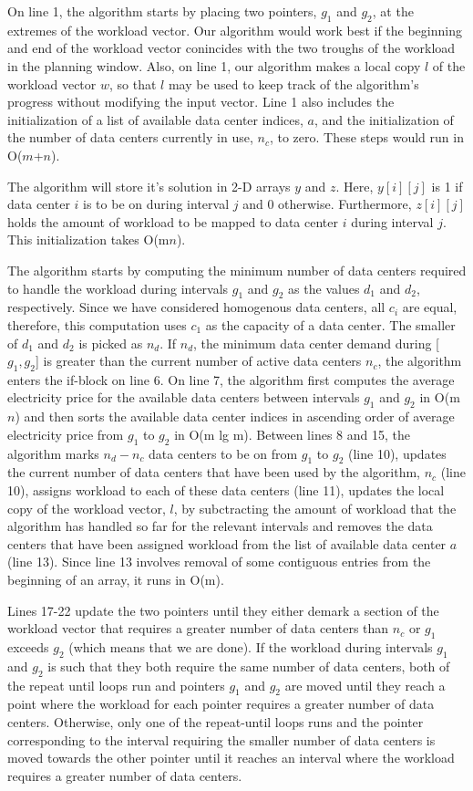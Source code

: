 On line 1, the algorithm starts by placing two pointers, $g_1$ and $g_2$, at the extremes of the workload vector. Our algorithm would work best if the beginning and end of the workload vector conincides with the two troughs of the workload in the planning window. Also, on line 1, our algorithm makes a local copy $l$ of the workload vector $w$, so that $l$ may be used to keep track of the algorithm's progress without modifying the input vector. Line 1 also includes the initialization of a list of available data center indices, $a$, and the initialization of the number of data centers currently in use, $n_c$, to zero. These steps would run in O($m$+$n$).

The algorithm will store it's solution in 2-D arrays $y$ and $z$. Here, $y[i][j]$ is 1 if data center $i$ is to be on during interval $j$ and 0 otherwise. Furthermore, $z[i][j]$ holds the amount of workload to be mapped to data center $i$ during interval $j$. This initialization takes O(m$n$).

The algorithm starts by computing the minimum number of data centers required to handle the workload during intervals $g_1$ and $g_2$ as the values $d_1$ and $d_2$, respectively. Since we have considered homogenous data centers, all $c_i$ are equal, therefore, this computation uses $c_1$ as the capacity of a data center. The smaller of $d_1$ and $d_2$ is picked as $n_d$. If $n_d$, the minimum data center demand during [$g_1, g_2$] is greater than the current number of active data centers $n_c$, the algorithm enters the if-block on line 6. On line 7, the algorithm first computes the average electricity price for the available data centers between intervals $g_1$ and $g_2$ in O(m$n$) and then sorts the available data center indices in ascending order of average electricity price from $g_1$ to $g_2$ in O(m lg m). Between lines 8 and 15, the algorithm marks $n_d - n_c$ data centers to be on from $g_1$ to $g_2$ (line 10), updates the current number of data centers that have been used by the algorithm, $n_c$ (line 10), assigns workload to each of these data centers (line 11), updates the local copy of the workload vector, $l$, by subctracting the amount of workload  that the algorithm has handled so far for the relevant intervals and removes the data centers that have been assigned workload from the list of available data center $a$ (line 13). Since line 13 involves removal of some contiguous entries from the beginning of an array, it runs in O(m).

Lines 17-22 update the two pointers until they either demark a section of the workload vector that requires a greater number of data centers than $n_c$ or $g_1$ exceeds $g_2$ (which means that we are done). If the workload during intervals $g_1$ and $g_2$ is such that they both require the same number of data centers, both of the repeat until loops run and pointers $g_1$ and $g_2$ are moved until they reach a point where the workload for each pointer requires a greater number of data centers. Otherwise, only one of the repeat-until loops runs and the pointer corresponding to the interval requiring the smaller number of data centers is moved towards the other pointer until it reaches an interval where the workload requires a greater number of data centers.

